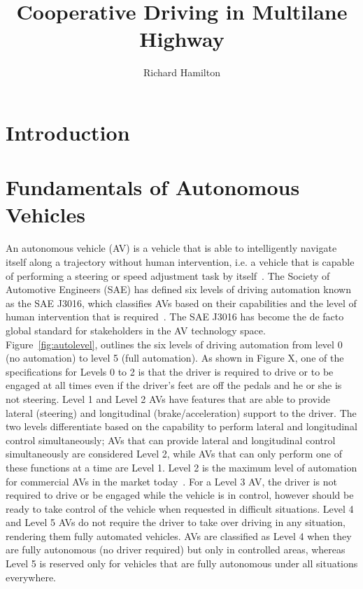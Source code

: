 \documentclass{article}
\title{Cooperative Driving in Multilane Highway}
\author{Richard Hamilton}
\date{}
\begin{document}
\maketitle
\section{Introduction}
%
%
%

%
\section{Fundamentals of Autonomous Vehicles}

An autonomous vehicle (AV) is a vehicle that is able to intelligently navigate itself along a trajectory without human intervention, i.e. a vehicle that is capable of performing a steering or speed adjustment task by itself~\cite{Bacha2017}. The Society of Automotive Engineers (SAE) has defined six levels of driving automation known as the SAE J3016, which classifies AVs based on their capabilities and the level of human intervention that is required~\cite{SAE}. The SAE J3016 has become the de facto global standard for stakeholders in the AV technology space. Figure~\ref{fig:autolevel}, outlines the six levels of driving automation from level 0 (no automation) to level 5 (full automation).  As shown in Figure X, one of the specifications for Levels 0 to 2 is that the driver is required to drive or to be engaged at all times even if the driver’s feet are off the pedals and he or she is not steering. Level 1 and Level 2 AVs have features that are able to provide lateral (steering) and longitudinal (brake/acceleration) support to the driver. The two levels differentiate based on the capability to perform lateral and longitudinal control simultaneously; AVs that can provide lateral and longitudinal control simultaneously are considered Level 2, while AVs that can only perform one of these functions at a time are Level 1. Level 2 is the maximum level of automation for commercial AVs in the market today~\cite{Wilko2018}. For a Level 3 AV, the driver is not required to drive or be engaged while the vehicle is in control, however should be ready to take control of the vehicle when requested in difficult situations. Level 4 and Level 5 AVs do not require the driver to take over driving in any situation, rendering them fully automated vehicles. AVs are classified as Level 4 when they are fully autonomous (no driver required) but only in controlled areas, whereas Level  5 is reserved only for vehicles that are fully autonomous under all situations everywhere.
\end{document}
